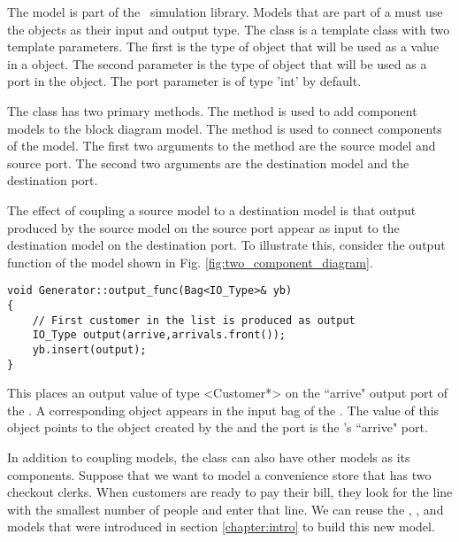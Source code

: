 The  model is part of the \adevs\ simulation library. 
Models that are part of a  must use the  objects as their input and output type.  The  class is a template class with two template parameters. The first is the type of object that will be used as a value in a  object.  The second parameter is the type of object that will be used as a port in the  object.  The port parameter is of type 'int' by default.

The  class has two primary methods. The  method is used
to add component models to the block diagram model. The 
method is used to connect components of the  model. The
first two arguments to the  method are the source model and
source port. The second two arguments are the destination model and
the destination port. 

The effect of coupling a source model to a destination model is that
output produced by the source model on the source port appear
as input to the destination model on the destination port. To
illustrate this, consider the output function of the  model
shown in Fig. \ref{fig:two_component_diagram}.
\begin{verbatim}
void Generator::output_func(Bag<IO_Type>& yb)
{
    // First customer in the list is produced as output
    IO_Type output(arrive,arrivals.front());
    yb.insert(output);
}
\end{verbatim}

This places an output value of type \classname<Customer*> on the ``arrive" output port of the .  A corresponding  object appears in the input bag of the . The value of this  object points to the  object created by the  and the port is the 's ``arrive" port.

In addition to coupling  models, the  class can also have other  models as its components. Suppose that we want to model a convenience store
that has two checkout clerks. When customers are ready to pay their
bill, they look for the line with the smallest number of people and
enter that line. We can reuse the , , and 
models that were introduced in section \ref{chapter:intro} to build this new model. 

